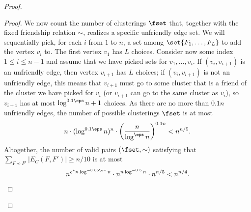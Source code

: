 \begin{proof}
\begin{proof}
We now count the number of clusterings $\fset$ that, together with the fixed friendship relation $\sim$, realizes a specific unfriendly edge set.
We will sequentially pick, for each $i$ from $1$ to $n$, a set among $\set{F_1,\ldots,F_L}$ to add the vertex $v_i$ to.
The first vertex $v_1$ has $L$ choices. Consider now some index $1 \le i \le n-1$ and assume that we have picked sets for $v_1,\ldots,v_{i}$. If $(v_i,v_{i+1})$ is an unfriendly edge, then vertex $v_{i+1}$ has $L$ choices; if $(v_i,v_{i+1})$ is not an unfriendly edge, this means that $v_{i+1}$ must go to some cluster that is a friend of the cluster we have picked for $v_{i}$ (or $v_{i+1}$ can go to the same cluster as $v_i$), so $v_{i+1}$ has at most $\log^{0.1\eps} n + 1$ choices.
As there are no more than $0.1n$ unfriendly edges, the number of possible clusterings $\fset$ is at most
$$
n\cdot (\log^{0.1\eps} n)^n \cdot \bigg(\frac{n}{\log^{\eps} n}\bigg)^{0.1n} < n^{n/5}.
$$
Altogether, the number of valid pairs $(\fset,\sim)$ satisfying that $\sum_{F\not\sim F'}|E_{C}(F,F')|\ge n/10$ is at most
$$
n^{c^*n \log^{-0.05\eps} n} \cdot n^{n \log^{-0.5}n} \cdot n^{n/5} < n^{n/4}.
$$
\end{proof}



\end{proof}
